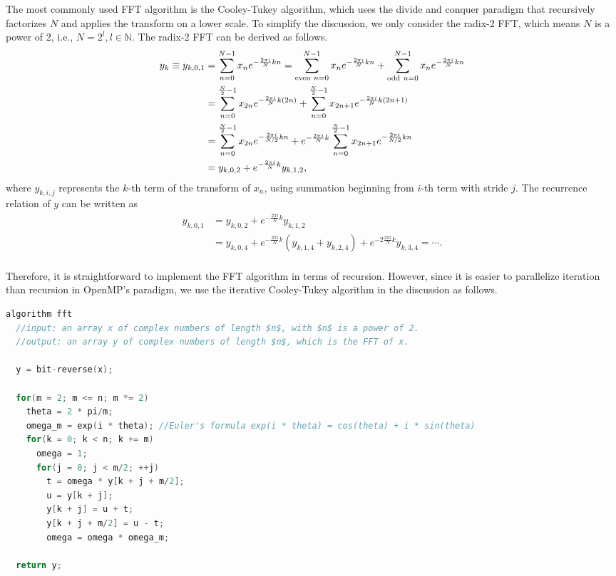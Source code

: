\documentclass[amsmath,amssymb]{revtex4}
\begin{document}
The most commonly used FFT algorithm is the Cooley-Tukey algorithm, which uses the divide and conquer paradigm that recursively factorizes $N$ and applies the transform on a lower scale. To simplify the discussion, we only consider the radix-2 FFT, which means $N$ is a power of 2, i.e., $N=2^l, l\in\mathbb{N}$. The radix-2 FFT can be derived as follows.
\begin{equation*}
\begin{aligned} 
y_k\equiv y_{k,0,1} &= \sum^{N-1}_{n=0}x_ne^{-\frac{2\pi i}{N}kn} = \sum^{N-1}_{{\rm even}~n=0}x_ne^{-\frac{2\pi i}{N}kn} + \sum^{N-1}_{{\rm odd}~n=0}x_ne^{-\frac{2\pi i}{N}kn}\\
&= \sum^{\frac{N}{2}-1}_{n=0}x_{2n}e^{-\frac{2\pi i}{N}k(2n)} + \sum^{\frac{N}{2}-1}_{n=0}x_{2n+1}e^{-\frac{2\pi i}{N}k(2n+1)}\\
&= \sum^{\frac{N}{2}-1}_{n=0}x_{2n}e^{-\frac{2\pi i}{N/2}kn} + e^{-\frac{2\pi i}{N}k}\sum^{\frac{N}{2}-1}_{n=0}x_{2n+1}e^{-\frac{2\pi i}{N/2}kn}\\
&=y_{k,0,2} + e^{-\frac{2\pi i}{N}k}y_{k,1,2},
\end{aligned} 
\end{equation*}
where $y_{k,i,j}$ represents the $k$-th term of the transform of $x_n$, using summation beginning from $i$-th term with stride $j$. The recurrence relation of $y$ can be written as
\begin{equation*}
\begin{aligned} 
y_{k,0,1} &= y_{k,0,2} + e^{-\frac{2\pi i}{N}k}y_{k,1,2}\\
                                &=y_{k,0,4} + e^{-\frac{2\pi i}{N}k}(y_{k,1,4}+y_{k,2,4})+e^{-2\frac{2\pi i}{N}k}y_{k,3,4}=\cdots.\\
\end{aligned} 
\end{equation*}

Therefore, it is straightforward to implement the FFT algorithm in terms of recursion. However, since it is easier to parallelize iteration than recursion in OpenMP's paradigm, we use the iterative Cooley-Tukey algorithm in the discussion as follows.
\begin{lstlisting}[language=C, caption={Iterative Cooley-Tukey algorithm for FFT}, label=list:list1]
algorithm fft
  //input: an array x of complex numbers of length $n$, with $n$ is a power of 2.
  //output: an array y of complex numbers of length $n$, which is the FFT of x.
  
  y = bit-reverse(x);
  
  for(m = 2; m <= n; m *= 2)
    theta = 2 * pi/m;
    omega_m = exp(i * theta); //Euler's formula exp(i * theta) = cos(theta) + i * sin(theta)
    for(k = 0; k < n; k += m)
      omega = 1;
      for(j = 0; j < m/2; ++j)
        t = omega * y[k + j + m/2];
        u = y[k + j];
        y[k + j] = u + t;
        y[k + j + m/2] = u - t;
        omega = omega * omega_m;

  return y;
\end{lstlisting}
\end{document}
